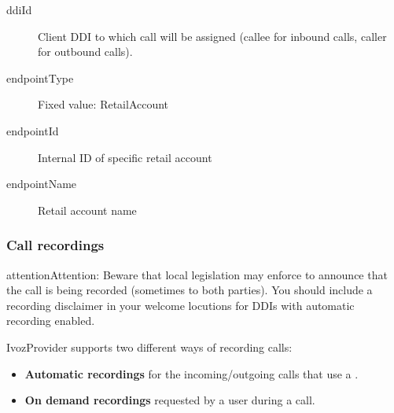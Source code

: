 \documentclass[letterpaper,10pt,english]{sphinxmanual}
\begin{document}
\begin{description}
\item[{ddiId}] \leavevmode{}\label{administration_portal/client/retail/calls/call_csv_schedulers:term-ddiid}
Client DDI to which call will be assigned (callee for inbound calls, caller for outbound calls).

\item[{endpointType}] \leavevmode{}\label{administration_portal/client/retail/calls/call_csv_schedulers:term-endpointtype}
Fixed value: RetailAccount

\item[{endpointId}] \leavevmode{}\label{administration_portal/client/retail/calls/call_csv_schedulers:term-endpointid}
Internal ID of specific retail account

\item[{endpointName}] \leavevmode{}\label{administration_portal/client/retail/calls/call_csv_schedulers:term-endpointname}
Retail account name

\end{description}


\subsubsection{Call recordings}
\label{administration_portal/client/retail/calls/call_recordings::doc}\label{administration_portal/client/retail/calls/call_recordings:call-recordings}\label{administration_portal/client/retail/calls/call_recordings:id1}
\begin{notice}{attention}{Attention:}
Beware that local legislation may enforce to announce that the
call is being recorded (sometimes to both parties). You should include
a recording disclaimer in your welcome locutions for DDIs with automatic
recording enabled.
\end{notice}

IvozProvider supports two different ways of recording calls:
\begin{itemize}
\item {} 
\textbf{Automatic recordings} for the incoming/outgoing calls that use a
{\hyperref[administration_portal/client/vpbx/ddis:ddis]{}}.

\item {} 
\textbf{On demand recordings} requested by a user during a call.

\end{itemize}
\end{document}
